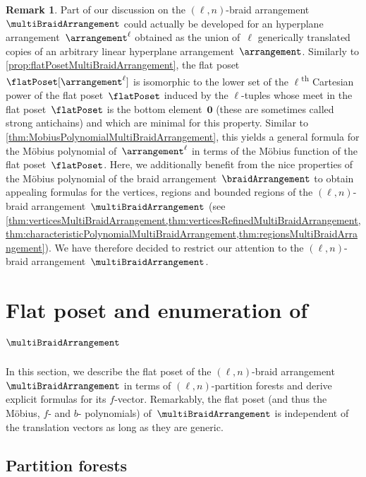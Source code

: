 \documentclass{amsart}
\theoremstyle{definition}
\newtheorem{remark}[theorem]{Remark}
\renewcommand{\b}[1]{{\boldsymbol{#1}}} %
\newcommand{\ordinal}{\textsuperscript{th}} %
\renewcommand{\b}[1]{\boldsymbol{#1}} %
\begin{document}
\begin{remark}
Part of our discussion on the $(\ell,n)$-braid arrangement~$\multiBraidArrangement$ could actually be developed for an hyperplane arrangement~$\arrangement^\ell$ obtained as the union of~$\ell$ generically translated copies of an arbitrary linear hyperplane arrangement~$\arrangement$.
Similarly to \cref{prop:flatPosetMultiBraidArrangement}, the flat poset~$\flatPoset[\arrangement^\ell]$ is isomorphic to the lower set of the $\ell$\ordinal{} Cartesian power of the flat poset~$\flatPoset$ induced by the $\ell$-tuples whose meet in the flat poset~$\flatPoset$ is the bottom element~$\b{0}$ (these are sometimes called strong antichains) and which are minimal for this property.
Similar to \cref{thm:MobiusPolynomialMultiBraidArrangement}, this yields a general formula for the M\"obius polynomial of~$\arrangement^\ell$ in terms of the M\"obius function of the flat poset~$\flatPoset$.
Here, we additionally benefit from the nice properties of the M\"obius polynomial of the braid arrangement~$\braidArrangement$ to obtain appealing formulas for the vertices, regions and bounded regions of the $(\ell,n)$-braid arrangement~$\multiBraidArrangement$ (see \cref{thm:verticesMultiBraidArrangement,thm:verticesRefinedMultiBraidArrangement,thm:characteristicPolynomialMultiBraidArrangement,thm:regionsMultiBraidArrangement}).
We have therefore decided to restrict our attention to the $(\ell,n)$-braid arrangement~$\multiBraidArrangement$.
\end{remark}


\section{Flat poset and enumeration of~$\multiBraidArrangement$}
\label{sec:flatPoset}

In this section, we describe the flat poset of the $(\ell,n)$-braid arrangement~$\multiBraidArrangement$ in terms of $(\ell,n)$-partition forests and derive explicit formulas for its $f$-vector.
Remarkably, the flat poset (and thus the M\"obius, $f$- and $b$- polynomials) of~$\multiBraidArrangement$ is independent of the translation vectors as long as they are generic.


\subsection{Partition forests}
\label{subsec:partitionForests}
\end{document}
